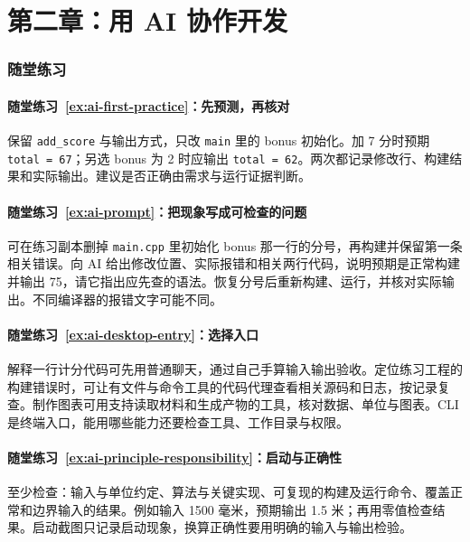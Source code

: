 \section*{第二章：用 AI 协作开发}
{}
\subsubsection*{随堂练习}

\paragraph*{随堂练习~\ref{ex:ai-first-practice}：先预测，再核对}
\begin{solution}
保留 \texttt{add\_score} 与输出方式，只改 \texttt{main} 里的 bonus 初始化。加 7 分时预期 \texttt{total = 67}；另选 bonus 为 2 时应输出 \texttt{total = 62}。两次都记录修改行、构建结果和实际输出。建议是否正确由需求与运行证据判断。
\end{solution}

\paragraph*{随堂练习~\ref{ex:ai-prompt}：把现象写成可检查的问题}
\begin{solution}
可在练习副本删掉 \texttt{main.cpp} 里初始化 bonus 那一行的分号，再构建并保留第一条相关错误。向 AI 给出修改位置、实际报错和相关两行代码，说明预期是正常构建并输出 75，请它指出应先查的语法。恢复分号后重新构建、运行，并核对实际输出。不同编译器的报错文字可能不同。
\end{solution}

\paragraph*{随堂练习~\ref{ex:ai-desktop-entry}：选择入口}
\begin{solution}
解释一行计分代码可先用普通聊天，通过自己手算输入输出验收。定位练习工程的构建错误时，可让有文件与命令工具的代码代理查看相关源码和日志，按记录复查。制作图表可用支持读取材料和生成产物的工具，核对数据、单位与图表。CLI 是终端入口，能用哪些能力还要检查工具、工作目录与权限。
\end{solution}

\paragraph*{随堂练习~\ref{ex:ai-principle-responsibility}：启动与正确性}
\begin{solution}
至少检查：输入与单位约定、算法与关键实现、可复现的构建及运行命令、覆盖正常和边界输入的结果。例如输入 1500 毫米，预期输出 1.5 米；再用零值检查结果。启动截图只记录启动现象，换算正确性要用明确的输入与输出检验。
\end{solution}

